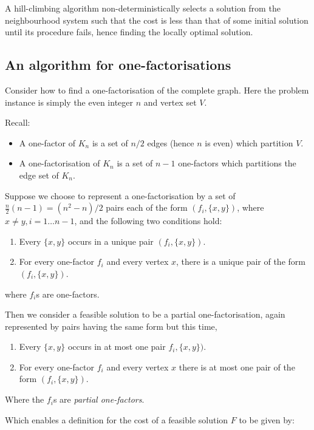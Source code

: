 A hill-climbing algorithm non-deterministically selects a solution from the neighbourhood system such that the cost is less than that of some initial solution until its procedure fails, hence finding the locally optimal solution.

\subsection{An algorithm for one-factorisations}

Consider how to find a one-factorisation of the complete graph.
Here the problem instance is simply the even integer $n$ and vertex set $V$.

Recall:
\begin{itemize}
  \item{A one-factor of $K_n$ is a set of $n/2$ edges (hence $n$ is even) which partition $V$.}
  \item{A one-factorisation of $K_n$ is a set of $n - 1$ one-factors which partitions the edge set of $K_n$.}
\end{itemize}

Suppose we choose to represent a one-factorisation by a set of $\frac{n}{2}(n - 1) = (n^2 - n)/2$ pairs each of the form $(f_i, \{x, y\})$, where $x \neq y, i = 1 \ldots n - 1$, and the following two conditions hold:
\begin{enumerate}
  \item{Every $\{x, y\}$ occurs in a unique pair $(f_i, \{x, y\})$.}
  \item{For every one-factor $f_i$ and every vertex $x$, there is a unique pair of the form $(f_i, \{x, y\})$.}
\end{enumerate}
where $f_i$s are one-factors.

Then we consider a feasible solution to be a partial one-factorisation, again represented by pairs having the same form but this time,

\begin{enumerate}
  \item{Every $\{x, y\}$ occurs in at most one pair $f_i, \{x, y\})$.}
  \item{For every one-factor $f_i$ and every vertex $x$ there is at most one pair of the form $(f_i, \{x, y\})$.}
\end{enumerate}

Where the $f_i$s are \emph{partial one-factors}.

Which enables a definition for the cost of a feasible solution $F$ to be given by:

